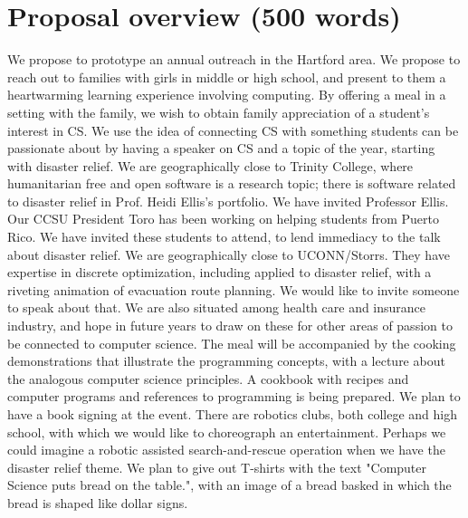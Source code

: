 \documentclass[]{article}
\begin{document}
\section{Proposal overview (500 words)}
We propose to prototype an annual outreach in the Hartford area.
We propose to reach out to families with girls in middle or high school, and present to them a heartwarming learning experience involving computing. By offering a meal in a setting with the family, we wish to obtain family appreciation of a student's interest in CS.
We use the idea of connecting CS with something students can be passionate about by having a speaker on CS and a topic of the year, starting with disaster relief. We are geographically close to Trinity College, where humanitarian free and open software is a research topic; there is software related to disaster relief in Prof. Heidi Ellis's portfolio. We have invited Professor Ellis. Our CCSU President Toro has been working on helping students from Puerto Rico. We have invited these students to attend, to lend immediacy to the talk about disaster relief.  We are geographically close to UCONN/Storrs. They have expertise in discrete optimization, including applied to disaster relief, with a riveting animation of evacuation route planning. We would like to invite someone to speak about that.
We are also situated among health care and insurance industry, and hope in future years to draw on these for other areas of passion to be connected to computer science.
The meal will be accompanied by the cooking demonstrations that illustrate the programming concepts, with a lecture about the analogous computer science principles. 
A cookbook with recipes and computer programs and references to programming is being prepared. We plan to have a book signing at the event.
There are robotics clubs, both college and high school, with which we would like to choreograph an entertainment. Perhaps we could imagine a robotic assisted search-and-rescue operation when we have the disaster relief theme. %
We plan to give out T-shirts with the text "Computer Science puts bread on the table.", with an image of a bread basked in which the bread is shaped like dollar signs.%
\end{document}
